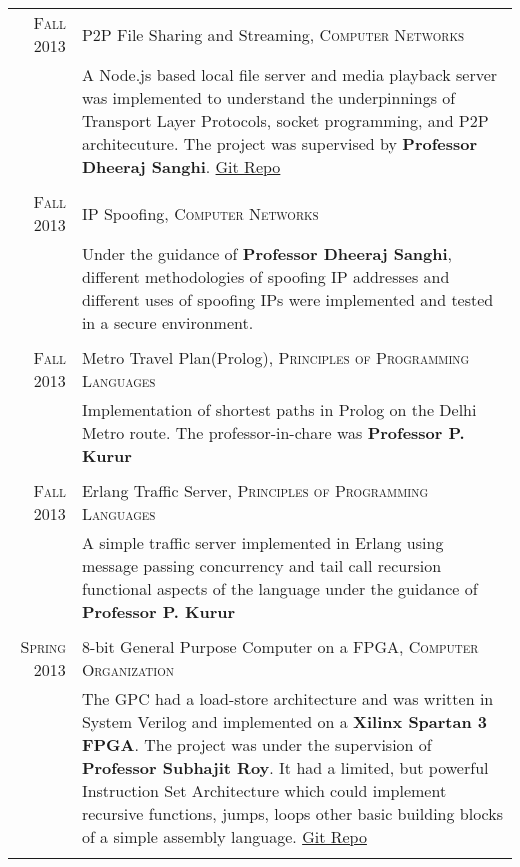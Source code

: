 \documentclass[a4paper,10pt]{article} %
\begin{document}
\begin{tabular}{r|p{11cm}}
    \textsc{Fall 2013} & P2P File Sharing and Streaming, \textsc{Computer Networks} \\
                       & \footnotesize{A Node.js based local file server and media playback server was implemented
                          to understand the underpinnings of Transport Layer Protocols, socket programming,
                          and P2P architecuture.  The project was supervised by \textbf{Professor Dheeraj Sanghi}.
                          \href{https://github.com/srijanshetty/nodesock} {Git Repo}}\\
                          \\

    \textsc{Fall 2013} & IP Spoofing, \textsc{Computer Networks} \\
                       & \footnotesize{Under the guidance of \textbf{Professor Dheeraj Sanghi}, different methodologies
                          of spoofing IP addresses and different uses of spoofing IPs were implemented and tested
                          in a secure environment.}\\
                          \\

    \textsc{Fall 2013} & Metro Travel Plan(Prolog), \textsc{Principles of Programming Languages} \\
                       & \footnotesize{Implementation of shortest paths in Prolog on the Delhi Metro route.
                          The professor-in-chare was \textbf{Professor P. Kurur}}\\
                          \\

    \textsc{Fall 2013} & Erlang Traffic Server, \textsc{Principles of Programming Languages} \\
                       & \footnotesize{A simple traffic server implemented in Erlang using message passing
                          concurrency and tail call recursion functional aspects of the language under the
                          guidance of \textbf{Professor P. Kurur}}\\
                          \\

    \textsc{Spring 2013} & 8-bit General Purpose Computer on a FPGA, \textsc{Computer Organization} \\
                         & \footnotesize{The GPC had a load-store architecture and was written in System Verilog and
                            implemented on a \textbf{Xilinx Spartan 3 FPGA}.  The project was under the
                            supervision of \textbf{Professor Subhajit Roy}.  It had a limited, but powerful
                            Instruction Set Architecture which could implement recursive functions, jumps,
                            loops  other basic building blocks of a simple assembly language.
                            \href{https://github.com/srijanshetty/220_y11} {Git Repo}} \\
                            \\


\end{tabular}
\end{document}
